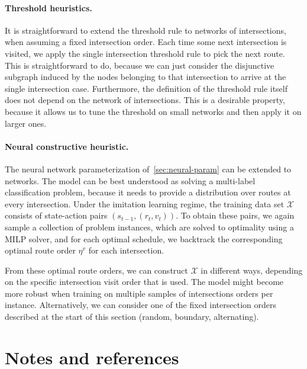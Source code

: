 \documentclass[a4paper]{report}
\theoremstyle{definition}
\theoremstyle{plain}
\begin{document}
\paragraph{Threshold heuristics.}
It is straightforward to extend the threshold rule to networks of
intersections, when assuming a fixed intersection order. Each time some
next intersection is visited, we apply the single intersection threshold rule to
pick the next route. This is straightforward to do, because we can just consider
the disjunctive subgraph induced by the nodes belonging to that intersection to
arrive at the single intersection case.
%
Furthermore, the definition of the threshold rule itself does not depend on the
network of intersections. This is a desirable property, because it allows us to
tune the threshold on small networks and then apply it on larger ones.

\paragraph{Neural constructive heuristic.}

The neural network parameterization of~\eqref{sec:neural-param} can be extended
to networks.
%
The model can be best understood as solving a multi-label classification
problem, because it needs to provide a distribution over routes at every
intersection.
%
Under the imitation learning regime, the training data set $\mathcal{X}$
consists of state-action pairs $(s_{t-1}, (r_{t}, v_{t}))$.
%
To obtain these pairs, we again sample a collection of problem instances, which
are solved to optimality using a MILP solver, and for each optimal schedule, we
backtrack the corresponding optimal route order $\eta^{v}$ for each
intersection.

From these optimal route orders, we can construct $\mathcal{X}$ in different
ways, depending on the specific intersection visit order that is used.
The model might become more robust when training on multiple samples of
intersections orders per instance.
Alternatively, we can consider one of the fixed intersection orders
described at the start of this section (random, boundary, alternating).




\section{Notes and references}
\end{document}
